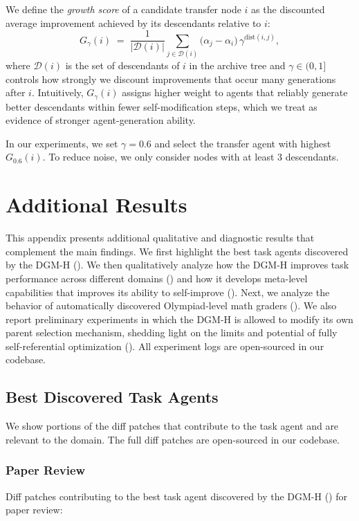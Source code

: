 \documentclass[]{fairmeta}
\begin{document}
We define the \emph{growth score} of a candidate transfer node \(i\) as the discounted average improvement achieved by its descendants relative to \(i\):
\[
G_\gamma(i)
\;=\;
\frac{1}{|\mathcal{D}(i)|}
\sum_{j \in \mathcal{D}(i)}
\bigl(\alpha_j - \alpha_i\bigr)\,\gamma^{\mathrm{dist}(i,j)},
\]
where \(\mathcal{D}(i)\) is the set of descendants of \(i\) in the archive tree and \(\gamma \in (0,1]\) controls how strongly we discount improvements that occur many generations after \(i\).
Intuitively, \(G_\gamma(i)\) assigns higher weight to agents that reliably generate better descendants within fewer self-modification steps, which we treat as evidence of stronger agent-generation ability.

In our experiments, we set \(\gamma = 0.6\) and select the transfer agent with highest \(G_{0.6}(i)\). To reduce noise, we only consider nodes with at least 3 descendants.

\section{Additional Results}
\label{app:res}

This appendix presents additional qualitative and diagnostic results that complement the main findings. We first highlight the best task agents discovered by the DGM-H (). We then qualitatively analyze how the DGM-H improves task performance across different domains () and how it develops meta-level capabilities that improves its ability to self-improve (). Next, we analyze the behavior of automatically discovered Olympiad-level math graders (). We also report preliminary experiments in which the DGM-H is allowed to modify its own parent selection mechanism, shedding light on the limits and potential of fully self-referential optimization (). All experiment logs are open-sourced in our codebase.

\subsection{Best Discovered Task Agents}
\label{app:best-agents}

We show portions of the diff patches that contribute to the task agent and are relevant to the domain. The full diff patches are open-sourced in our codebase.

\subsubsection{Paper Review}
\label{app:best-agents-paperreview}
Diff patches contributing to the best task agent discovered by the DGM-H () for paper review:

\end{document}
